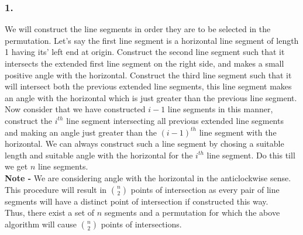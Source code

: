 \documentclass[a4paper]{article}
\begin{document}
\subsubsection*{1.}
We will construct the line segments in order they are to be selected in the permutation. Let's say the first line segment is a horizontal line segment of length 1 having its' left end at origin. Construct the second line segment such that it intersects the extended first line segment on the right side, and makes a small positive angle with the horizontal. 
Construct the third line segment such that it will intersect both the previous extended line segments, this line segment makes an angle with the horizontal which is just greater than the previous line segment.
Now consider that we have constructed $i-1$ line segments in this manner, construct the $i^{th}$ line segment intersecting all previous extended line segments and making an angle just greater than the ${(i-1)}^{th}$ line segment with the horizontal. We can always construct such a line segment by chosing a suitable length and suitable angle with the horizontal for the $i^{th}$ line segment. Do this till we get $n$ line segments.\\
\textbf{Note - }We are considering angle with the horizontal in the anticlockwise sense.\\
This procedure will result in $n\choose2$ points of intersection as every pair of line segments will have a distinct point of intersection if constructed this way.\\
Thus, there exist a set of $n$ segments and a permutation for which the above algorithm will cause $n\choose2$ points of intersections.
\end{document}
